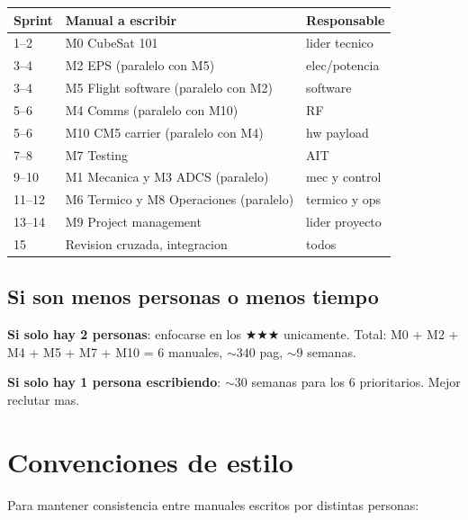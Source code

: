 \documentclass[11pt,a4paper,oneside]{report}
\begin{document}
\begin{center}
\begin{tabular}{lll}
\toprule
\textbf{Sprint} & \textbf{Manual a escribir} & \textbf{Responsable} \\
\midrule
1--2  & M0 CubeSat 101                            & lider tecnico \\
3--4  & M2 EPS (paralelo con M5)                  & elec/potencia \\
3--4  & M5 Flight software (paralelo con M2)      & software \\
5--6  & M4 Comms (paralelo con M10)               & RF \\
5--6  & M10 CM5 carrier (paralelo con M4)         & hw payload \\
7--8  & M7 Testing                                 & AIT \\
9--10 & M1 Mecanica y M3 ADCS (paralelo)          & mec y control \\
11--12 & M6 Termico y M8 Operaciones (paralelo)    & termico y ops \\
13--14 & M9 Project management                     & lider proyecto \\
15    & Revision cruzada, integracion              & todos \\
\bottomrule
\end{tabular}
\end{center}

\section{Si son menos personas o menos tiempo}

\textbf{Si solo hay 2 personas}: enfocarse en los $\bigstar\bigstar\bigstar$
unicamente. Total: M0 + M2 + M4 + M5 + M7 + M10 = 6 manuales, $\sim 340$ pag,
$\sim 9$ semanas.

\textbf{Si solo hay 1 persona escribiendo}: $\sim 30$ semanas para los 6
prioritarios. Mejor reclutar mas.

\chapter{Convenciones de estilo}

Para mantener consistencia entre manuales escritos por distintas personas:
\end{document}
